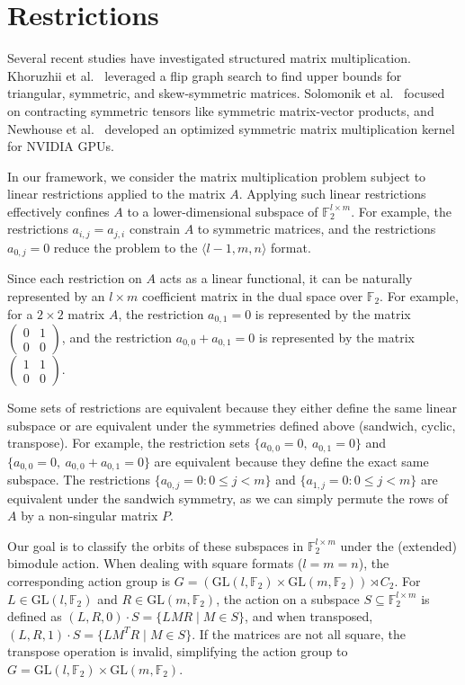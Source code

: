 \documentclass[11pt]{article}
\begin{document}
\section{Restrictions}\label{sec:restrictions}
Several recent studies have investigated structured matrix multiplication. Khoruzhii et al.~\cite{khoruzhii2025fasteralgorithmsstructuredmatrix} leveraged a flip graph search to find upper bounds for triangular, symmetric, and skew-symmetric matrices. Solomonik et al.~\cite{solomonik2015contracting} focused on contracting symmetric tensors like symmetric matrix-vector products, and Newhouse et al.~\cite{newhouse2024faster} developed an optimized symmetric matrix multiplication kernel for NVIDIA GPUs.

In our framework, we consider the matrix multiplication problem subject to linear restrictions applied to the matrix $A$. Applying such linear restrictions effectively confines $A$ to a lower-dimensional subspace of $\mathbb{F}_2^{l\times m}$. For example, the restrictions $a_{i,j}=a_{j,i}$ constrain $A$ to symmetric matrices, and the restrictions $a_{0,j}=0$ reduce the problem to the $\langle l-1,m,n\rangle$ format.

Since each restriction on $A$ acts as a linear functional, it can be naturally represented by an $l \times m$ coefficient matrix in the dual space over $\mathbb{F}_2$.
For example, for a $2\times 2$ matrix $A$, the restriction $a_{0,1}=0$ is represented by the matrix $\begin{pmatrix} 0 & 1 \\ 0 & 0 \end{pmatrix}$,
and the restriction $a_{0,0}+a_{0,1}=0$ is represented by the matrix $\begin{pmatrix} 1 & 1 \\ 0 & 0 \end{pmatrix}$.

Some sets of restrictions are equivalent because they either define the same linear subspace or are equivalent under the symmetries defined above (sandwich, cyclic, transpose).
For example, the restriction sets $\{a_{0,0}=0,\ a_{0,1}=0\}$ and $\{a_{0,0}=0,\ a_{0,0}+a_{0,1}=0\}$ are equivalent because they define the exact same subspace.
The restrictions $\{a_{0,j}=0 : 0\le j<m\}$ and $\{a_{1,j}=0 : 0\le j<m\}$ are equivalent under the sandwich symmetry, as we can simply permute the rows of $A$ by a non-singular matrix $P$.

Our goal is to classify the orbits of these subspaces in $\mathbb{F}_2^{l\times m}$ under the (extended) bimodule action. When dealing with square formats ($l=m=n$), the corresponding action group is $G=(\mathrm{GL}(l,\mathbb{F}_2)\times \mathrm{GL}(m,\mathbb{F}_2)) \rtimes C_2$.
For $L \in \mathrm{GL}(l,\mathbb{F}_2)$ and $R \in \mathrm{GL}(m,\mathbb{F}_2)$, the action on a subspace $S \subseteq \mathbb{F}_2^{l\times m}$ is defined as $(L,R,0)\cdot S = \{LMR \mid M\in S\}$, and when transposed, $(L,R,1)\cdot S = \{LM^T R \mid M\in S\}$. If the matrices are not all square, the transpose operation is invalid, simplifying the action group to $G=\mathrm{GL}(l,\mathbb{F}_2)\times \mathrm{GL}(m,\mathbb{F}_2)$.
\end{document}
